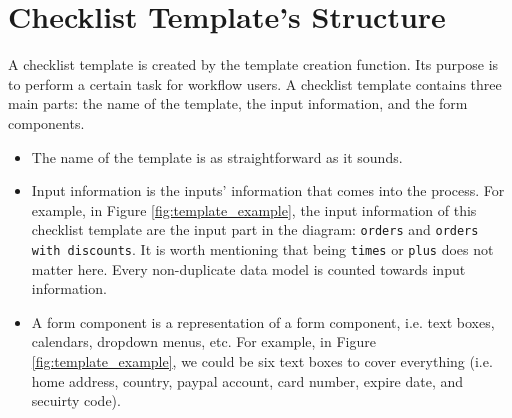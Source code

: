 
\section{Checklist Template's Structure}
\label{checklist_strcuture}






A checklist template is created by the template creation function. Its purpose is to perform a certain task for workflow users.
A checklist template contains three main parts: the name of the template, the input information, and the form components.

\begin{itemize}
    \item The name of the template is as straightforward as it sounds.
    \item Input information is the inputs' information that comes into the process.
    For example, in Figure \ref{fig:template_example}, the input information of this checklist template are the input part in the diagram: \verb!orders! and \verb!orders with discounts!. It is worth mentioning that being \verb!times! or \verb!plus! does not matter here. Every non-duplicate data model is counted towards input information.
    \item A form component is a representation of a form component, i.e. text boxes, calendars, dropdown menus, etc. For example, in Figure \ref{fig:template_example}, we could be six text boxes to cover everything (i.e. home address, country, paypal account, card number, expire date, and secuirty code).
\end{itemize}


